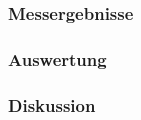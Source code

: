 \documentclass[12pt,a4paper]{article}
\begin{document}
\subsubsection{Messergebnisse}
\subsubsection{Auswertung}
\subsubsection{Diskussion}
\end{document}
